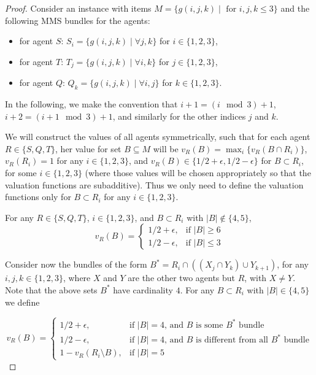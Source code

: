 \begin{proof}
Consider an instance with items $M=\{g(i,j,k)\mid \mbox{ for } i,j,k \le 3\}$
and the following MMS bundles for the agents:
\begin{itemize}
    \item for agent $S$: $S_i=\{g(i,j,k)\mid \forall j,k\}$ for $i\in \{1,2,3\}$,
    \item for agent $T$: $T_j=\{g(i,j,k)\mid \forall i,k\}$ for $j\in \{1,2,3\}$,
    \item for agent $Q$: $Q_k=\{g(i,j,k)\mid \forall i,j\}$ for $k\in \{1,2,3\}$.
\end{itemize}
In the following, we make the convention that $i+1 = (i\mod 3) +1$, $i+2 = (i+1 \mod 3) +1$, and similarly for the other indices $j$ and $k$. 


We will construct the values of all agents symmetrically, such that for each agent $R\in \{S,Q,T\}$, her value for set $B \subseteq M$ will be $v_R(B)=\max_i\{v_R(B \cap R_i)\}$, $v_R(R_i)=1$ for any $i\in \{1,2,3\}$, and $v_R(B)\in\{1/2+\epsilon,1/2-\epsilon\}$ for $B\subset R_i$, for some $i\in\{1,2,3\}$ (where those values will be chosen appropriately so that the valuation functions are subadditive). 
Thus we only need to define the valuation functions only for $B \subset R_i$ for any $i\in \{1,2,3\}$.

For any $R\in \{S,Q,T\}$, $i\in \{1,2,3\}$, and $B \subset R_i$ with $\lvert B\rvert \notin \{4,5\}$, 
\begin{equation}
   \label{eq:422T}
       v_R(B)=\begin{cases}
      1/2 + \epsilon, & \text{if } \lvert B\rvert \geq 6\\
      1/2 - \epsilon, & \text{if } \lvert B\rvert \leq 3
      \end{cases}
   \end{equation} 

 

Consider now the bundles of the form $B^*=R_i\cap((X_j\cap Y_{k})\cup Y_{k+1})$, for any $i,j,k\in \{1,2,3\}$, where $X$ and $Y$ are the other two agents but $R$, with $X\neq Y$. Note that the above sets $B^*$ have cardinality $4$. For any $B \subset R_i$ with $\lvert B\rvert \in \{4,5\}$ we define

\begin{equation}
   \label{eq:422T}
       v_R(B)=\begin{cases}
      1/2 + \epsilon, & \text{if $\lvert B\rvert = 4$, and $B$ is some $B^*$ bundle}\\
      1/2 - \epsilon, & \text{if $\lvert B\rvert = 4$, and $B$ is different from all $B^*$ bundle} \\
      1-v_R(R_i\setminus B), & \text{if $\lvert B\rvert = 5$}
      \end{cases}
   \end{equation} 




\end{proof}
